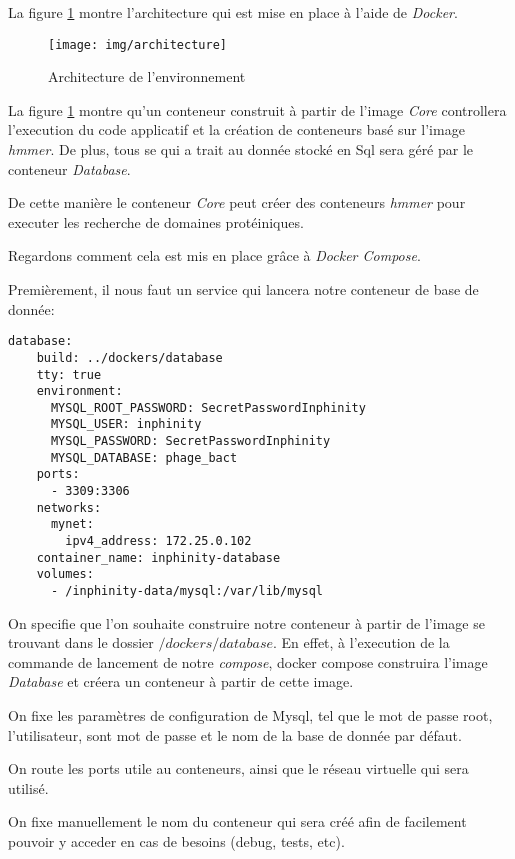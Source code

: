 La figure \ref{fig:architecture} montre l'architecture qui est mise en place à l'aide de \emph{Docker}.

\begin{figure}[H] 
\centering 
\texttt{[image: img/architecture]} 
\caption[architecture]{Architecture de l'environnement}
\label{fig:architecture} 
\end{figure}

La figure \ref{fig:architecture} montre qu'un conteneur construit à partir de l'image \emph{Core} controllera l'execution du code applicatif et la création de conteneurs basé sur l'image \emph{hmmer}. De plus, tous se qui a trait au donnée stocké en Sql sera géré par le conteneur \emph{Database}.

De cette manière le conteneur \emph{Core} peut créer des conteneurs \emph{hmmer} pour executer les recherche de domaines protéiniques.

Regardons comment cela est mis en place grâce à \emph{Docker Compose}. 

Premièrement, il nous faut un service qui lancera notre conteneur de base de donnée:

\begin{lstlisting}[frame=single]
database:
    build: ../dockers/database
    tty: true
    environment:
      MYSQL_ROOT_PASSWORD: SecretPasswordInphinity
      MYSQL_USER: inphinity
      MYSQL_PASSWORD: SecretPasswordInphinity
      MYSQL_DATABASE: phage_bact
    ports:
      - 3309:3306
    networks:
      mynet:
        ipv4_address: 172.25.0.102
    container_name: inphinity-database
    volumes:
      - /inphinity-data/mysql:/var/lib/mysql
\end{lstlisting}

On specifie que l'on souhaite construire notre conteneur à partir de l'image se trouvant dans le dossier \emph{$/dockers/database$}. En effet, à l'execution de la commande de lancement de notre \emph{compose}, docker compose construira l'image \emph{Database} et créera un conteneur à partir de cette image.

On fixe les paramètres de configuration de Mysql, tel que le mot de passe root, l'utilisateur, sont mot de passe et le nom de la base de donnée par défaut.

On route les ports utile au conteneurs, ainsi que le réseau virtuelle qui sera utilisé.

On fixe manuellement le nom du conteneur qui sera créé afin de facilement pouvoir y acceder en cas de besoins (debug, tests, etc).

